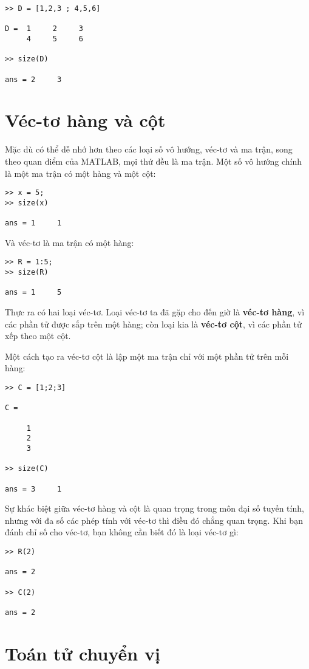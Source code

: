 \documentclass[12pt]{book}
\begin{document}
\begin{verbatim}
>> D = [1,2,3 ; 4,5,6]

D =  1     2     3
     4     5     6

>> size(D)

ans = 2     3
\end{verbatim}
%

\section{Véc-tơ hàng và cột}

Mặc dù có thể dễ nhớ hơn theo các loại số vô hướng, véc-tơ và ma trận,
song theo quan điểm của MATLAB, mọi thứ đều là ma trận. Một số 
vô hướng chính là một ma trận có một hàng và một cột:

\begin{verbatim}
>> x = 5;
>> size(x)

ans = 1     1
\end{verbatim}
%
Và véc-tơ là ma trận có một hàng:

\begin{verbatim}
>> R = 1:5;
>> size(R)

ans = 1     5
\end{verbatim}
%
Thực ra có hai loại véc-tơ. Loại véc-tơ ta đã gặp cho đến giờ là 
{\bf véc-tơ hàng}, vì các phần tử được sắp trên một hàng; còn
loại kia là {\bf véc-tơ cột}, vì các phần tử xếp theo một cột.

Một cách tạo ra véc-tơ cột là lập một ma trận chỉ với một phần tử
trên mỗi hàng:

\begin{verbatim}
>> C = [1;2;3]

C =

     1
     2
     3

>> size(C)

ans = 3     1
\end{verbatim}
%
Sự khác biệt giữa véc-tơ hàng và cột là quan trọng trong môn
đại số tuyến tính, nhưng với đa số các phép tính với véc-tơ thì
điều đó chẳng quan trọng. Khi bạn đánh chỉ số cho véc-tơ, bạn
không cần biết đó là loại véc-tơ gì:

\begin{verbatim}
>> R(2)

ans = 2

>> C(2)

ans = 2
\end{verbatim}



\section{Toán tử chuyển vị}
\end{document}
